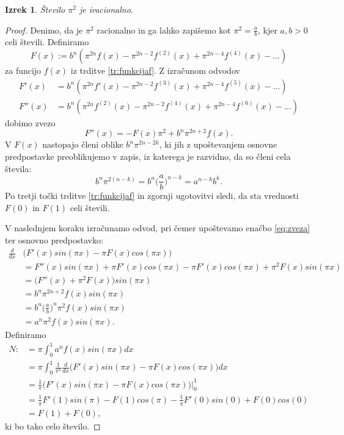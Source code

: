 \documentclass[a4paper]{article}
\theoremstyle{plain}
\newtheorem{izrek}{Izrek}
\newcommand{\odvod}[1]{f^{({#1})}(x)}
\newcommand{\pina}[1]{\pi^{#1}}
\begin{document}
\begin{izrek}
Število $\pina{2}$ je iracionalno.
\end{izrek}
\begin{proof}
Denimo, da je $\pina{2}$ racionalno in ga lahko zapišemo kot $\pina{2}=\frac{a}{b}$, kjer $a,b>0$ celi števili. Definiramo 
\begin{equation*}
F(x):=b^n(\pina{2n}f(x)-\pina{2n-2}\odvod{2}+\pina{2n-4}\odvod{4}-\dots)
\end{equation*}
za funcijo $f(x)$ iz trditve \ref{tr:funkcijaf}. Z izračunom odvodov
\begin{align*}
F'(x)&=b^n(\pina{2n}f'(x)-\pina{2n-2}\odvod{3}+\pina{2n-4}\odvod{5}-\dots) \\
F''(x)&=b^n(\pina{2n}\odvod{2}-\pina{2n-2}\odvod{4}+\pina{2n-4}\odvod{6}-\dots)
\end{align*}
dobimo zvezo
\begin{equation}
F''(x)=-F(x)\pina{2}+b^n\pina{2n+2}f(x).
\label{eq:zveza}
\end{equation}
V $F(x)$ nastopajo členi oblike $b^n\pina{2n-2k}$, ki jih z upoštevanjem osnovne predpostavke preoblikujemo v zapis, iz katerega je razvidno, da so členi cela števila:
\begin{equation*}
 b^n\pina{2(n-k)} = b^n\bigg(\frac{a}{b}\bigg)^{n-k} = a^{n-k}b^k.
\end{equation*}
Po tretji točki trditve \ref{tr:funkcijaf} in zgornji ugotovitvi sledi, da sta vrednosti $F(0)$ in $F(1)$ celi števili.

V naslednjem koraku izračunamo odvod, pri čemer upoštevamo enačbo \eqref{eq:zveza} ter osnovno predpostavko:
\begin{align*}
\frac{d}{dx}&\big( F'(x)sin(\pi x)-\pi F(x)cos(\pi x) \big) \\
&=F''(x)sin(\pi x)+\pi F'(x)cos(\pi x)-\pi F'(x)cos(\pi x)+\pina{2} F(x)sin(\pi x) \\
&=\big( F''(x)+\pina{2} F(x) \big) sin(\pi x) \\
&= b^n\pina{2n+2}f(x)sin(\pi x) \\
&=b^n\bigg(\frac{a}{b}\bigg)^n\pina{2}f(x)sin(\pi x) \\
&=a^n\pina{2}f(x)sin(\pi x).
\end{align*}
Definiramo 
\begin{align*}
N:&=\pi \int_{0}^{1}a^nf(x)sin(\pi x)dx \\
&=\pi \int_{0}^{1}\frac{1}{\pina{2}} \frac{d}{dx}\big( F'(x)sin(\pi x)-\pi F(x)cos(\pi x) \big)dx \\
&=\frac{1}{\pi}\big( F'(x)sin(\pi x)-\pi F(x)cos(\pi x) \big) \big|_0^1 \\
&=\frac{1}{\pi} F'(1)sin(\pi)- F(1)cos(\pi)-\frac{1}{\pi} F'(0)sin(0)+F(0)cos(0)\\
&=F(1)+F(0),
\end{align*}
ki bo tako celo število. 


\end{proof}
\end{document}

